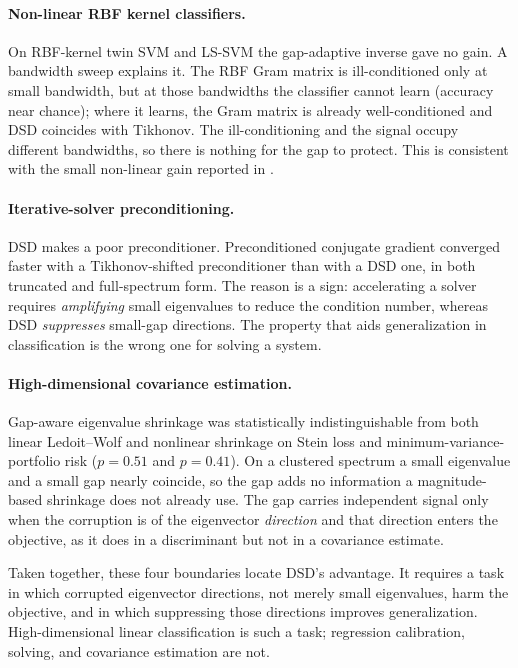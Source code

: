 \documentclass[preprint,12pt]{elsarticle}
\begin{document}
\paragraph{Non-linear RBF kernel classifiers.} On RBF-kernel twin SVM and LS-SVM the gap-adaptive
inverse gave no gain. A bandwidth sweep explains it. The RBF Gram matrix is ill-conditioned only at
small bandwidth, but at those bandwidths the classifier cannot learn (accuracy near chance); where it
learns, the Gram matrix is already well-conditioned and DSD coincides with Tikhonov. The
ill-conditioning and the signal occupy different bandwidths, so there is nothing for the gap to
protect. This is consistent with the small non-linear gain reported in \cite{vashishtha2026dsd}.

\paragraph{Iterative-solver preconditioning.} DSD makes a poor preconditioner. Preconditioned
conjugate gradient converged faster with a Tikhonov-shifted preconditioner than with a DSD one, in
both truncated and full-spectrum form. The reason is a sign: accelerating a solver requires
\emph{amplifying} small eigenvalues to reduce the condition number, whereas DSD \emph{suppresses}
small-gap directions. The property that aids generalization in classification is the wrong one for
solving a system.

\paragraph{High-dimensional covariance estimation.} Gap-aware eigenvalue shrinkage was statistically
indistinguishable from both linear Ledoit--Wolf \cite{ledoit2004shrinkage} and nonlinear shrinkage
\cite{ledoit2020nonlinear} on Stein loss and minimum-variance-portfolio risk ($p=0.51$ and $p=0.41$).
On a clustered spectrum a small eigenvalue and a small gap nearly coincide, so the gap adds no
information a magnitude-based shrinkage does not already use. The gap carries independent signal only
when the corruption is of the eigenvector \emph{direction} and that direction enters the objective, as
it does in a discriminant but not in a covariance estimate.

Taken together, these four boundaries locate DSD's advantage. It requires a task in which corrupted
eigenvector directions, not merely small eigenvalues, harm the objective, and in which suppressing
those directions improves generalization. High-dimensional linear classification is such a task;
regression calibration, solving, and covariance estimation are not.
\end{document}
